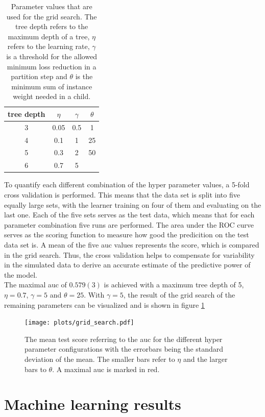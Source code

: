   \begin{table}
    \centering
    \begin{tabular}{c c c c}
      \toprule
      tree depth & $\eta$ & $\gamma$ & $\theta$ \\
      \midrule
      3 & 0.05 & 0.5 & 1  \\
      4 & 0.1  & 1   & 25  \\
      5 & 0.3  & 2 & 50  \\
      6 & 0.7  & 5   &  \\
    \end{tabular}
    \caption{Parameter values that are used for the grid search. The tree depth refers to the maximum depth of a tree, $\eta$ refers to the learning rate,
    $\gamma$ is a threshold for the allowed minimum loss reduction in a partition step and $\theta$ is the minimum sum of instance weight needed in a child.}
    \label{tab:grid}
  \end{table}
To quantify each different combination of the hyper parameter values, a 5-fold cross validation is performed. This means that the data set is split into five equally
large sets, with the learner training on four of them and evaluating on the last one. Each of the five sets serves as the test data, which means that for each
parameter combination five runs are performed. The area under the ROC curve serves as the scoring function to measure how good the predicition on the test data set is.
A mean of the five auc values represents the score, which is compared in the grid search. Thus, the cross validation helps to compensate for variability in the simulated
data to derive an accurate estimate of the predictive power of the model. \\
The maximal auc of $0.579(3)$ is achieved with a maximum tree depth of 5, $\eta=0.7$, $\gamma=5$ and $\theta=25$. With $\gamma=5$, the result of the grid search of the remaining
parameters can be visualized and is shown in figure \ref{fig:grid}

\begin{figure}
  \centering
  \texttt{[image: plots/grid\_search.pdf]}
  \caption{The mean test score referring to the auc for the different hyper parameter configurations with the errorbars being the standard deviation of the mean. The
  smaller bars refer to $\eta$ and the larger bars to $\theta$. A maximal auc is marked in red.}
  \label{fig:grid}
\end{figure}

\section{Machine learning results}
